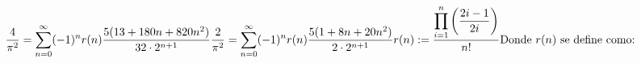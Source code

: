 \documentclass[preview]{standalone}
\begin{document}
\begin{align*}
\frac{4}{\pi^2} = \sum_{n=0}^{\infty} (-1)^n r(n) \frac{5(13 + 180n + 820n^2)}{32 \cdot 2^{n+1}}
\frac{2}{\pi^2} = \sum_{n=0}^{\infty} (-1)^n r(n) \frac{5(1 + 8n + 20n^2)}{2 \cdot 2^{n+1}}
 r(n) := \frac{\displaystyle\prod_{i=1}^{n} \left(\frac{2i-1}{2i}\right)}{n!}
\newline
\text{Donde }r(n) \text{ se define como:}
\end{align*}
\end{document}

